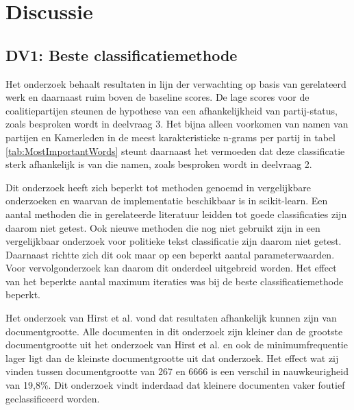 \section{Discussie}
\subsection{DV1: Beste classificatiemethode}
Het onderzoek behaalt resultaten in lijn der verwachting op basis van gerelateerd werk en daarnaast ruim boven de baseline scores. De lage scores voor de coalitiepartijen steunen de hypothese van een afhankelijkheid van partij-status, zoals besproken wordt in deelvraag 3. Het bijna alleen voorkomen van namen van partijen en Kamerleden in de meest karakteristieke n-grams per partij in tabel \ref{tab:MostImportantWords} steunt daarnaast het vermoeden dat deze classificatie sterk afhankelijk is van die namen, zoals besproken wordt in deelvraag 2.\par
Dit onderzoek heeft zich beperkt tot methoden genoemd in vergelijkbare onderzoeken en waarvan de implementatie beschikbaar is in scikit-learn. Een aantal methoden die in gerelateerde literatuur leidden tot goede classificaties zijn daarom niet getest. Ook nieuwe methoden die nog niet gebruikt zijn in een vergelijkbaar onderzoek voor politieke tekst classificatie zijn daarom niet getest. Daarnaast richtte zich dit ook maar op een beperkt aantal parameterwaarden. Voor vervolgonderzoek kan daarom dit onderdeel uitgebreid worden. Het effect van het beperkte aantal maximum iteraties was bij de beste classificatiemethode beperkt.\par
Het onderzoek van Hirst et al. vond dat resultaten afhankelijk kunnen zijn van documentgrootte. Alle documenten in dit onderzoek zijn kleiner dan de grootste documentgrootte uit het onderzoek van Hirst et al. en ook de minimumfrequentie lager ligt dan de kleinste documentgrootte uit dat onderzoek.
Het effect wat zij vinden tussen documentgrootte van 267 en 6666 is een verschil in nauwkeurigheid van 19,8\%. Dit onderzoek vindt inderdaad dat kleinere documenten vaker foutief geclassificeerd worden.
